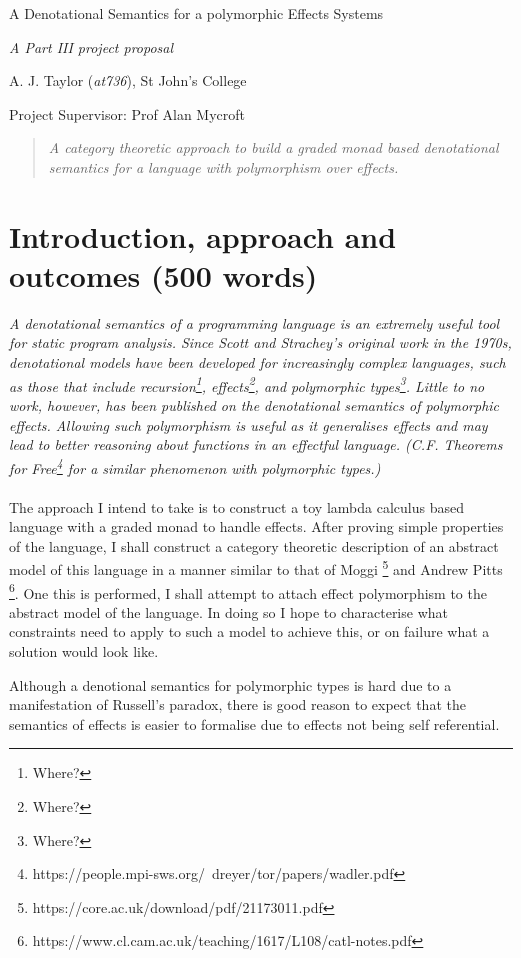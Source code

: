\documentclass[11pt]{article}
\newcommand\comment[1]{}
\begin{document}
\centerline{\Large A Denotational Semantics for a polymorphic Effects Systems}
\vspace{2em}
\centerline{\Large \emph{A Part III project proposal}}
\vspace{2em}
\centerline{\large A. J. Taylor (\emph{at736}), St John's College}
\vspace{1em}
\centerline{\large Project Supervisor: Prof Alan Mycroft}
\vspace{1em}

\begin{abstract}
\textsl{
	A category theoretic approach to build a graded monad based denotational semantics for a language with polymorphism over effects.
} 
\end{abstract}

\section{Introduction, approach and outcomes (500 words)}

\comment{Provide an introduction to your project or essay. In particular, try to
  motivate the work and explain the relevant context (general
  background, as well as sufficient detail about any related
  work).}
  
\textsl{
A denotational semantics of a programming language is an extremely useful tool for static program analysis. Since Scott and Strachey's original work in the 1970s, denotational models have been developed for increasingly complex languages, such as those that include recursion\footnote{Where?}, effects\footnote{Where?}, and polymorphic types\footnote{Where?}. Little to no work, however, has been published on the denotational semantics of polymorphic effects. Allowing such polymorphism is useful as it generalises effects and may lead to better reasoning about functions in an effectful language. (C.F. Theorems for Free\footnote{https://people.mpi-sws.org/~dreyer/tor/papers/wadler.pdf} for a similar phenomenon with polymorphic types.)
}




\paragraph{}{
The approach I intend to take is to construct a toy lambda calculus based language with a graded monad to handle effects. After proving simple properties of the language, I shall construct a category theoretic description of an abstract model of this language in a manner similar to that of Moggi \footnote{https://core.ac.uk/download/pdf/21173011.pdf} and Andrew Pitts \footnote{  https://www.cl.cam.ac.uk/teaching/1617/L108/catl-notes.pdf}. One this is performed, I shall attempt to attach effect polymorphism to the abstract model of the language. In doing so I hope to characterise what constraints need to apply to such a model to achieve this, or on failure what a solution would look like.

Although a denotional semantics for polymorphic types is hard due to a manifestation of Russell's paradox, there is good reason to expect that the semantics of effects is easier to formalise due to effects not being self referential.
}
\end{document}
